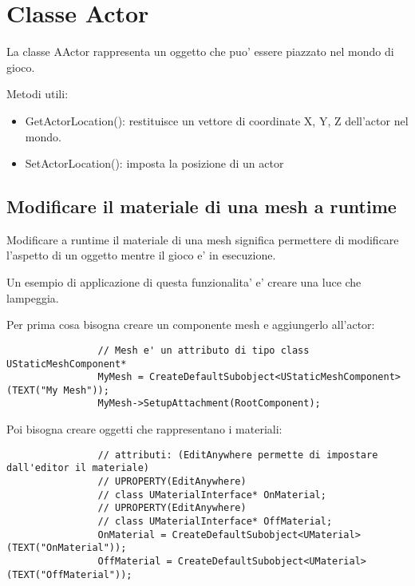     \section{Classe Actor}
        La classe AActor rappresenta un oggetto che puo' essere piazzato nel mondo di gioco.

        Metodi utili:
        \begin{itemize}
            \item GetActorLocation(): restituisce un vettore di coordinate X, Y, Z dell'actor nel mondo.
            \item SetActorLocation(): imposta la posizione di un actor
        \end{itemize}

        \subsection{Modificare il materiale di una mesh a runtime}
            Modificare a runtime il materiale di una mesh significa permettere di modificare l'aspetto di un oggetto mentre il gioco e' in esecuzione.

            Un esempio di applicazione di questa funzionalita' e' creare una luce che lampeggia.

            Per prima cosa bisogna creare un componente mesh e aggiungerlo all'actor:

            \begin{verbatim}
                // Mesh e' un attributo di tipo class UStaticMeshComponent*
                MyMesh = CreateDefaultSubobject<UStaticMeshComponent>(TEXT("My Mesh"));
                MyMesh->SetupAttachment(RootComponent);
            \end{verbatim}

            Poi bisogna creare oggetti che rappresentano i materiali:

            \begin{verbatim}
                // attributi: (EditAnywhere permette di impostare dall'editor il materiale)
                // UPROPERTY(EditAnywhere)
                // class UMaterialInterface* OnMaterial;
                // UPROPERTY(EditAnywhere)
                // class UMaterialInterface* OffMaterial;
                OnMaterial = CreateDefaultSubobject<UMaterial>(TEXT("OnMaterial"));
                OffMaterial = CreateDefaultSubobject<UMaterial>(TEXT("OffMaterial"));
            \end{verbatim}


